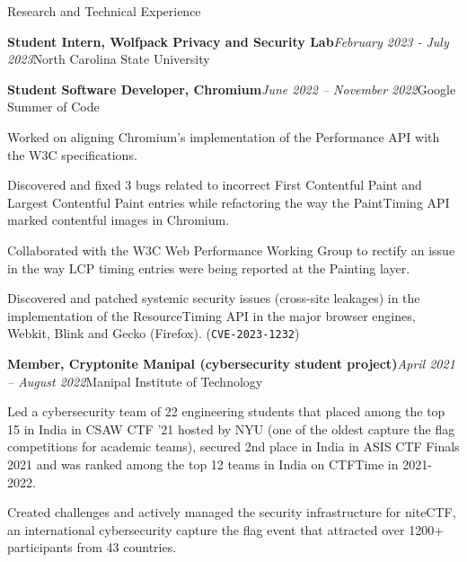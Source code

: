 \documentclass{resume} %
\begin{document}
\begin{rSection}{Research and Technical Experience}
\begin{rSubsection}{\bf Student Intern, Wolfpack Privacy and Security Lab}{\em February 2023 - July 2023}{North Carolina State University}{}
\end{rSubsection}
\begin{rSubsection}{\bf Student Software Developer, Chromium}{\em June 2022 -- November 2022}{Google Summer of Code}{}
\item Worked on aligning Chromium's implementation of the Performance API with the W3C specifications.
\item Discovered and fixed 3 bugs related to incorrect First Contentful Paint and Largest Contentful Paint entries while refactoring the way the PaintTiming API marked contentful images in Chromium.
\item Collaborated with the W3C Web Performance Working Group to rectify an issue in the way LCP timing entries were being reported at the Painting layer.
\item Discovered and patched systemic security issues (cross-site leakages) in the implementation of the ResourceTiming API in the major browser engines, Webkit, Blink and Gecko (Firefox). (\texttt{CVE-2023-1232})
\end{rSubsection}
\begin{rSubsection}{\bf Member, Cryptonite Manipal (cybersecurity student project)}{\em April 2021 -- August 2022}{Manipal Institute of Technology}{}
\item Led a cybersecurity team of 22 engineering students that placed among the top 15 in India in CSAW CTF '21 hosted by NYU (one of the oldest capture the flag competitions for academic teams), secured 2nd place in India in ASIS CTF Finals 2021 and was ranked among the top 12 teams in India on CTFTime in 2021-2022.
\item Created challenges and actively managed the security infrastructure for niteCTF, an international cybersecurity capture the flag event that attracted over 1200+ participants from 43 countries.

\end{rSubsection}
\end{rSection}
\end{document}

